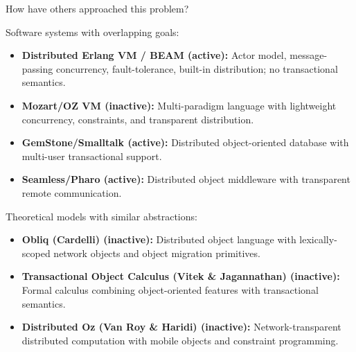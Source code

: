 \documentclass[handout,aspectratio=169,xcolor=dvipsnames,10pt]{beamer}
\begin{document}
\begin{frame}{How have others approached this problem?}

\vfill

Software systems with overlapping goals:
\begin{itemize}
  \item \textbf{Distributed Erlang VM / BEAM (active):} Actor model, message-passing concurrency,
  fault-tolerance, built-in distribution; no transactional semantics.
  \item \textbf{Mozart/OZ VM (inactive):} Multi-paradigm language with lightweight concurrency,
  constraints, and transparent distribution.
  \item \textbf{GemStone/Smalltalk (active):} Distributed object-oriented database with
  multi-user transactional support.
  \item \textbf{Seamless/Pharo (active):} Distributed object middleware with transparent remote communication.
\end{itemize}

\vspace{0.5em}

Theoretical models with similar abstractions:
\begin{itemize}
  \item \textbf{Obliq (Cardelli) (inactive):} Distributed object language with lexically-scoped
  network objects and object migration primitives.
  \item \textbf{Transactional Object Calculus (Vitek \& Jagannathan) (inactive):} Formal calculus
  combining object-oriented features with transactional semantics.
  \item \textbf{Distributed Oz (Van Roy \& Haridi) (inactive):} Network-transparent distributed
  computation with mobile objects and constraint programming.
\end{itemize}

\vfill

\end{frame}

\end{document}
